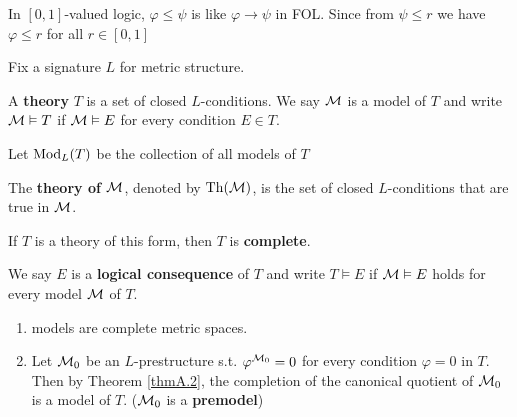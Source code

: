 \documentclass[11pt]{article}
\begin{document}
In \([0,1]\)-valued logic, \(\varphi\le\psi\) is like \(\varphi\to\psi\) in FOL. Since
from \(\psi\le r\) we have \(\varphi\le r\) for all \(r\in[0,1]\)

Fix a signature \(L\) for metric structure.

\begin{definition}[]
A \textbf{theory} \(T\) is a set of closed \(L\)-conditions. We say \(\mathcal{M}\) is a model of \(T\) and
write \(\mathcal{M}\vDash T\)  if \(\mathcal{M}\vDash E\) for every condition \(E\in T\).

Let \(\operatorname{Mod}_L(T)\) be the collection of all models of \(T\)

The \textbf{theory of \(\mathcal{M}\)}, denoted by \(\operatorname{Th}(\mathcal{M})\), is the set of closed \(L\)-conditions that are
true in \(\mathcal{M}\).

If \(T\) is a theory of this form, then \(T\) is \textbf{complete}.

We say \(E\) is a \textbf{logical consequence} of \(T\) and write \(T\vDash E\) if \(\mathcal{M}\vDash E\) holds
for every model \(\mathcal{M}\) of \(T\).
\end{definition}

\begin{remark}
\begin{enumerate}
\item models are complete metric spaces.
\item Let \(\mathcal{M}_0\) be an \(L\)-prestructure s.t. \(\varphi^{\mathcal{M}_0}=0\) for every
condition \(\varphi=0\) in \(T\). Then by Theorem \ref{thmA.2}, the completion of the canonical
quotient of \(\mathcal{M}_0\) is a model of \(T\). (\(\mathcal{M}_0\) is a \textbf{premodel})
\end{enumerate}
\end{remark}
\end{document}
